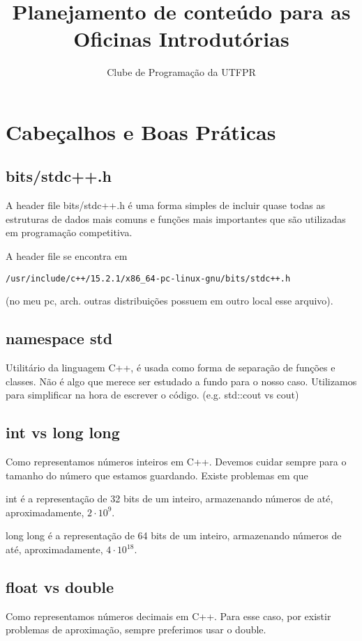 \documentclass{article}
\title{Planejamento de conteúdo para as Oficinas Introdutórias}
\author{Clube de Programação da UTFPR}
\begin{document}
\maketitle
\tableofcontents

\section{Cabeçalhos e Boas Práticas}
\subsection{bits/stdc++.h}
A header file bits/stdc++.h é uma forma simples de incluir quase todas as estruturas de dados 
mais comuns e funções mais importantes que são utilizadas em programação competitiva.

A header file se encontra em 
\begin{verbatim}
/usr/include/c++/15.2.1/x86_64-pc-linux-gnu/bits/stdc++.h     
\end{verbatim}
(no meu pc, arch. outras distribuições possuem em outro local esse arquivo). 

\subsection{namespace std}
Utilitário da linguagem C++, é usada como forma de separação de funções e classes.
Não é algo que merece ser estudado a fundo para o nosso caso.
Utilizamos para simplificar na hora de escrever o código. (e.g. std::cout vs cout)

\subsection{int vs long long}
Como representamos números inteiros em C++. Devemos cuidar sempre para o tamanho do 
número que estamos guardando. Existe problemas em que  

int é a representação de 32 bits de um inteiro, armazenando números de até, 
aproximadamente, $2\cdot10^9$.

long long é a representação de 64 bits de um inteiro, armazenando números de até, 
aproximadamente, $4\cdot10^18$.

\subsection{float vs double}
Como representamos números decimais em C++. Para esse caso, por existir problemas de 
aproximação, sempre preferimos usar o double.
\end{document}
